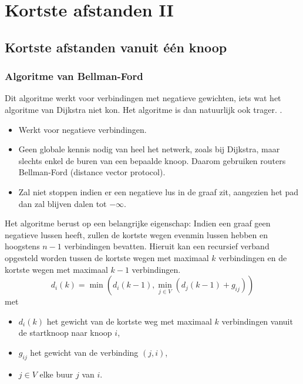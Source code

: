 \chapter{Kortste afstanden II}
\section{Kortste afstanden vanuit één knoop}
\subsection{Algoritme van Bellman-Ford}
Dit algoritme werkt voor verbindingen met negatieve gewichten, iets wat het algoritme van Dijkstra niet kon. Het algoritme is dan natuurlijk ook trager. .

\begin{itemize}
	\item  Werkt voor negatieve verbindingen.
	\item  Geen globale kennis nodig van heel het netwerk, zoals bij Dijkstra, maar slechts enkel de buren van een bepaalde knoop. Daarom gebruiken routers Bellman-Ford (distance vector protocol).
	\item  Zal niet stoppen indien er een negatieve lus in de graaf zit, aangezien het pad dan zal blijven dalen tot $-\infty$. 
\end{itemize}

Het algoritme berust op een belangrijke eigenschap: Indien een graaf geen negatieve lussen heeft, zullen de kortste wegen evenmin lussen hebben en hoogstens $n - 1$ verbindingen bevatten. Hieruit kan een recursief verband opgesteld worden tussen de kortste wegen met maximaal $k$ verbindingen en de kortste wegen met maximaal $k - 1$ verbindingen.
$$d_i(k) = \min(d_i(k - 1), \min\limits_{j \in V} (d_j(k - 1) + g_{ij}))$$
met
\begin{itemize}
	\item $d_i(k)$ het gewicht van de kortste weg met maximaal $k$ verbindingen vanuit de startknoop naar knoop $i$,
	\item $g_{ij}$ het gewicht van de verbinding $(j, i)$,
	\item $j \in V$ elke buur $j$ van $i$.
\end{itemize}




